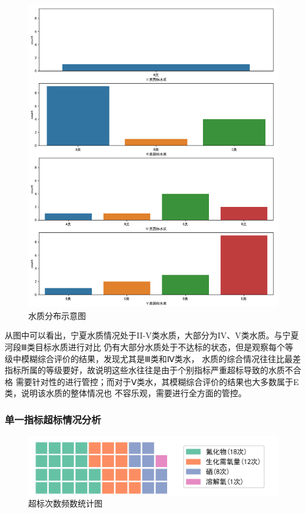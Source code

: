 \documentclass{whutmod}
\begin{document}
\begin{spacing}{1.2}
\begin{figure}[H]
	\centering
	\includegraphics[width=.8\textwidth]{细分.png}
	\caption{水质分布示意图}
	\label{水质分布示意图}
\end{figure}

从图中可以看出，宁夏水质情况处于II-V类水质，大部分为IV、V类水质。与宁夏河段Ⅲ类目标水质进行对比
仍有大部分水质处于不达标的状态，但是观察每个等级中模糊综合评价的结果，发现尤其是Ⅲ类和Ⅳ类水，
水质的综合情况往往比最差指标所属的等级要好，故说明这些水往往是由于个别指标严重超标导致的水质不合格
需要针对性的进行管控；而对于Ⅴ类水，其模糊综合评价的结果也大多数属于E类，说明该水质的整体情况也
不容乐观，需要进行全方面的管控。

\subsubsection{单一指标超标情况分析}

\begin{figure}[H]
	\centering
	\includegraphics[width=.9\textwidth]{超标次数频数统计图.png}
	\caption{超标次数频数统计图}
	\label{超标次数频数统计图}
\end{figure}


\end{spacing}
\end{document}
